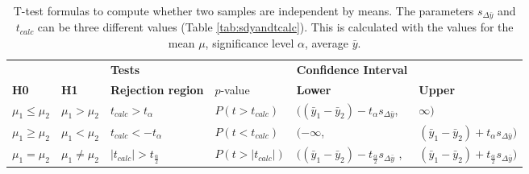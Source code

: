 \begin{itemize}
	\begin{table}[h!]
		\centering
		\caption{T-test formulas to compute whether two samples are independent by means. 
			The parameters $s_{\Delta\bar{y}}$ and $t_{calc}$ can be three different 
			values (Table \ref{tab:sdyandtcalc})\cite{heiberger2004statistical}. This is calculated with the values for the mean $\mu$, significance level $\alpha$, average $\bar{y}$.}
		\label{tab:IndepTest}
		\begin{tabular}{llllll}
			\hline
			&  & 
			\multicolumn{2}{l}{\textbf{Tests}} & 
			\textbf{Confidence Interval} & \textbf{}               \\ \cline{3-6} 
			\textbf{H0}              & \textbf{H1}              & \textbf{Rejection 
				region}   & $p$-value                      & 
			\textbf{Lower}               & \textbf{Upper}          \\ \hline
			$\mu_1 \leq \mu_2$                  & $\mu_1 > \mu_2$       & 
			$t_{calc} 
			> t_\alpha$       & $P(t > t_{calc})$      & 
			$((\bar{y}_1 
			- \bar{y}_2) - t_\alpha s_{\Delta \bar{y}}$,       & 
			$\infty)$                     \\
			$\mu_1 \geq \mu_2$                  & $\mu_1 < \mu_2$          & 
			$t_{calc} 
			< -t_\alpha$          & $P(t < t_{calc})$         & 
			$(-\infty$,                        & $(\bar{y}_1 - \bar{y}_2) + 
			t_\alpha 
			s_{\Delta \bar{y}})$ \\
			$\mu_1 = \mu_2$                  & $\mu_1 \neq \mu_2$                  
			& 
			$|t_{calc}| > t_{\frac{\alpha}{2}}$     & $P(t >
			|t_{calc}|)$  & $((\bar{y}_1 - \bar{y}_2) - 
			t_{\frac{\alpha}{2}} 
			s_{\Delta\bar{y}}$ 
			,     & $(\bar{y}_1 - \bar{y}_2) + t_{\frac{\alpha}{2}} 
			s_{\Delta 
				\bar{y}})$  
			\\ 
			\hline
		\end{tabular}
	\end{table}
	

\end{itemize}
